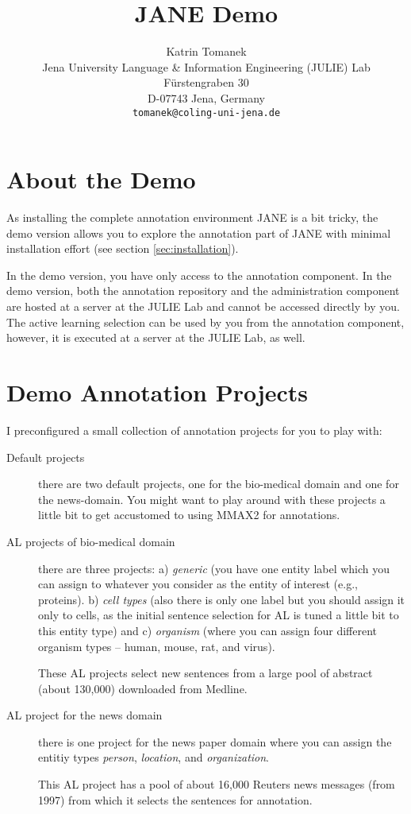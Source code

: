 \documentclass[DIV12,english,11pt,halfparskip]{scrartcl}
\title{JANE Demo}
\author{\normalsize Katrin Tomanek\\
  \normalsize  Jena University Language \& Information Engineering (JULIE) Lab\\
  \normalsize F\"urstengraben 30 \\
  \normalsize D-07743 Jena, Germany\\
  {\normalsize \tt tomanek@coling-uni-jena.de} } \date{}
\begin{document}
\maketitle
\newpage
\tableofcontents
\newpage

\section{About the Demo}
As installing the complete annotation environment JANE is a bit
tricky, the demo version allows you to explore the annotation part of
JANE with minimal installation effort (see section
\ref{sec:installation}).

In the demo version, you have only access to the annotation component.
In the demo version, both the annotation repository and the
administration component are hosted at a server at the JULIE Lab and
cannot be accessed directly by you. The active learning selection can
be used by you from the annotation component, however, it is executed
at a server at the JULIE Lab, as well.

\section{Demo Annotation Projects}
I preconfigured a small collection of annotation projects for you to
play with:

\begin{description}
\item[Default projects] there are two default projects, one for the
  bio-medical domain and one for the news-domain. You might want to
  play around with these projects a little bit to get accustomed to
  using MMAX2 for annotations.

\item[AL projects of bio-medical domain] there are three projects: a)
  \emph{generic} (you have one entity label which you can assign to
  whatever you consider as the entity of interest (e.g., proteins). b)
  \emph{cell types} (also there is only one label but you should
  assign it only to cells, as the initial sentence selection for AL is
  tuned a little bit to this entity type) and c) \emph{organism}
  (where you can assign four different organism types -- human, mouse,
  rat, and virus).

  These AL projects select new sentences from a large pool of abstract
  (about 130,000) downloaded from Medline.

\item[AL project for the news domain] there is one project for the
  news paper domain where you can assign the entitiy types
  \emph{person}, \emph{location}, and \emph{organization}.

  This AL project has a pool of about 16,000 Reuters news messages
  (from 1997) from which it selects the sentences for annotation.

\end{description}
\end{document}
